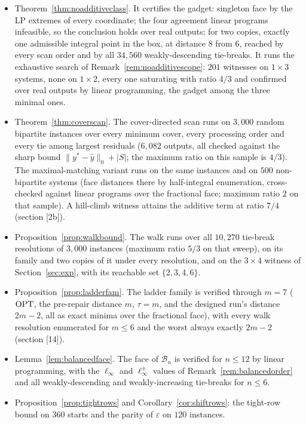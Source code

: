 \begin{itemize}
\item Theorem~\ref{thm:noadditiveclass}. It certifies the gadget: singleton face by the LP extremes
of every coordinate; the four agreement linear programs infeasible, so the conclusion holds over
real outputs; for two copies, exactly one admissible integral point in the box, at distance $8$
from $6$, reached by every scan order and by all $34{,}560$ weakly-descending tie-breaks. It runs
the exhaustive search of Remark~\ref{rem:noadditivescope}: $201$ witnesses on $1 \times 3$
systems, none on $1 \times 2$, every one saturating with ratio $4/3$ and confirmed over real
outputs by linear programming, the gadget among the three minimal ones.
\item Theorem~\ref{thm:coverscan}. The cover-directed scan runs on $3{,}000$ random bipartite
instances over every minimum cover, every processing order and every tie among largest residuals
($6{,}082$ outputs, all checked against the sharp bound $\|y^* - \hat y\|_0 + |S|$; the maximum
ratio on this sample is $4/3$). The maximal-matching variant runs on the same instances and on
$500$ non-bipartite systems (face distances there by half-integral enumeration, cross-checked
against linear programs over the fractional face; maximum ratio $2$ on that sample). A hill-climb
witness attains the additive term at ratio $7/4$ (section [2b]).
\item Proposition~\ref{prop:walkbound}. The walk runs over all $10{,}270$ tie-break resolutions of
$3{,}000$ instances (maximum ratio $5/3$ on that sweep), on its family and two copies of it under
every resolution, and on the $3 \times 4$ witness of Section~\ref{sec:exp}, with its reachable set
$\{2,3,4,6\}$.
\item Proposition~\ref{prop:ladderfam}. The ladder family is verified through $m = 7$ ($\mathrm{OPT}$, the
pre-repair distance $m$, $\tau = m$, and the designed run's distance $2m-2$, all as exact minima
over the fractional face), with every walk resolution enumerated for $m \le 6$ and the worst always
exactly $2m-2$ (section [14]).
\item Lemma~\ref{lem:balancedface}. The face of $\mathcal{B}_n$ is verified for $n \le 12$ by
linear programming, with the $\ell_\infty$ and $\ell_\infty^\pm$ values of
Remark~\ref{rem:balancedorder} and all weakly-descending and weakly-increasing tie-breaks for
$n \le 6$.
\item Proposition~\ref{prop:tightrows} and Corollary~\ref{cor:shiftrows}: the tight-row bound on
$360$ starts and the parity of $\varepsilon$ on $120$ instances.

\end{itemize}
